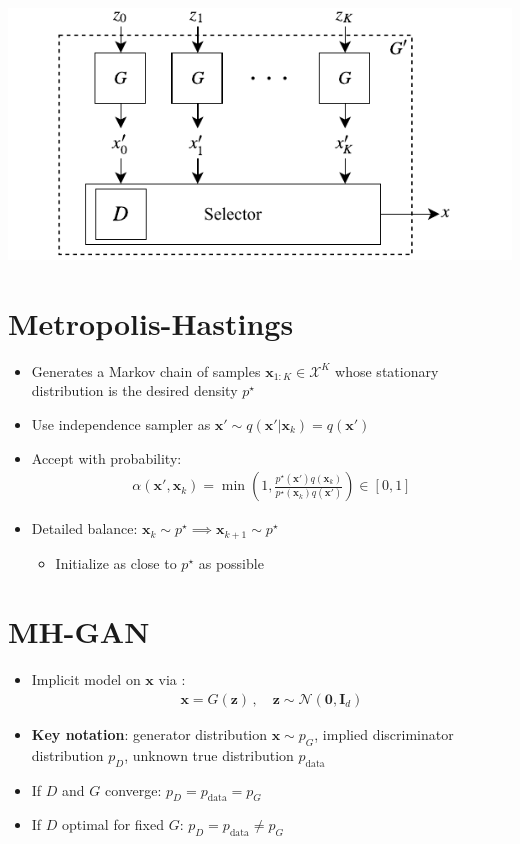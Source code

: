 \documentclass[a0,landscape]{a0poster}
\newcommand{\mysection}[1]{\section*{\fontsize{67.1}{82} \selectfont \color{NavyBlue} #1 \color{Black}}}
\renewcommand{\vec}[1]{{\boldsymbol{\mathbf{#1}}}} %
\newcommand{\R}{\mathbb{R}}
\newcommand{\set}[1]{\mathcal{#1}}
\newcommand{\sample}{\sim}
\newcommand{\given}{|}
\newcommand{\norm}{\mathcal{N}}
\newcommand{\target}{{p^\star}}
\newcommand{\prop}{q}
\newcommand{\pinit}{{p_0}}
\newcommand{\PG}{{p_G}}
\newcommand{\PD}{{p_D}}
\newcommand{\PR}{{p_{\textrm{data}}}}
\newcommand{\accept}{\alpha}
\newcommand{\setx}{\set{X}}
\begin{document}
\begin{multicols}{3}
\hspace{7mm}
\includegraphics[scale=2.75]{../figures/block_diag.pdf}
\vspace{-2cm}

\mysection{Metropolis-Hastings}

\begin{itemize}
  \item Generates a Markov chain of samples $\vec x_{1:K} \in \setx^K$ whose stationary distribution is the desired density $\target$
  \item Use independence sampler as $\vec x' \sample \prop(\vec x' \given \vec x_k)=\prop(\vec x')$
  \item Accept with probability:
  \begin{align}
    \accept(\vec x', \vec x_k) = \min\left(1, \frac{\target(\vec x')\prop(\vec x_k)}{\target(\vec x_k)\prop(\vec x')}\right) \in [0,1]
  \end{align}
  \item Detailed balance: $\vec x_k \sample \target \implies \vec x_{k+1} \sample \target$
  \begin{itemize}
    \item Initialize as close to $\target$ as possible
  \end{itemize}
\end{itemize}

\columnbreak

\mysection{MH-GAN}

\begin{itemize}
  \item Implicit model on $\vec x$ via \smash{$G \in \R^{d} \rightarrow \setx$}:
  \begin{align}
    \vec x = G(\vec z)\,, \quad \vec z \sample \norm(\vec 0, \vec I_{d})
  \end{align}
  \item \textbf{Key notation}: generator distribution $\vec x \sample \PG$, implied discriminator distribution $\PD$, unknown true distribution $\PR$
  \item If $D$ and $G$ converge: $\PD = \PR = \PG$
  \item If $D$ optimal for fixed $G$: $\PD = \PR \neq \PG$
\end{itemize}


\end{multicols}
\end{document}
